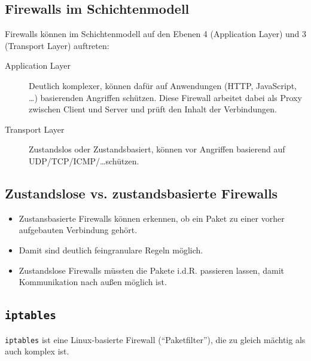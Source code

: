 \documentclass[a4paper, 11pt, accentcolor = tud3b]{tudreport}
\begin{document}
	        \subsection{Firewalls im Schichtenmodell}
		        Firewalls können im Schichtenmodell auf den Ebenen 4 (Application Layer) und 3 (Transport Layer) auftreten:
		        \begin{description}
		        	\item[Application Layer] Deutlich komplexer, können dafür auf Anwendungen (HTTP, JavaScript, \dots) basierenden Angriffen schützen. Diese Firewall arbeitet dabei als Proxy zwischen Client und Server und prüft den Inhalt der Verbindungen.
		        	\item[Transport Layer] Zustandslos oder Zustandsbasiert, können vor Angriffen basierend auf UDP/TCP/ICMP/\dots schützen.
		        \end{description}
        
	        \subsection{Zustandslose vs. zustandsbasierte Firewalls}
		        \begin{itemize}
		        	\item Zustansbasierte Firewalls können erkennen, ob ein Paket zu einer vorher aufgebauten Verbindung gehört.
		        	\item Damit sind deutlich feingranulare Regeln möglich.
		        	\item Zustandslose Firewalls müssten die Pakete i.d.R. passieren lassen, damit Kommunikation nach außen möglich ist.
		        \end{itemize}
	        
		    \subsection{\texttt{iptables}}
			    \texttt{iptables} ist eine Linux-basierte Firewall (\enquote{Paketfilter}), die zu gleich mächtig als auch komplex ist.
			    
\end{document}
